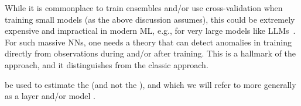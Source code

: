 While it is commonplace to train ensembles and/or use cross-validation when training small models (as the above discussion assumes),
this could be extremely expensive and impractical in modern ML, e.g., for very large models like LLMs~\cite{LLMS}.
For such massive NNs, one needs a theory that can detect anomalies in training directly from observations during and/or after training.
This is a hallmark of the \SETOL approach, and it distinguishes \SETOL from the classic \STATMECH approach.



be used to estimate the \AverageGeneralizationAccuracy (and not the \Precision),
and which we will refer to more generally as a layer and/or model \Quality.
